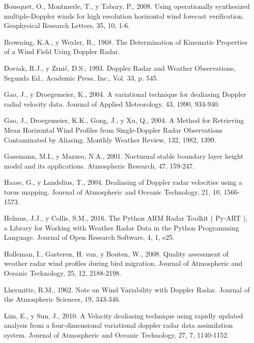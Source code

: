 \documentclass[12pt,spanish,oneside]{book}
\begin{document}
\hypertarget{ref-Bousquet2008}{}
Bousquet, O., Montmerle, T., y Tabary, P., 2008. Using operationally
synthesized multiple-Doppler winds for high resolution horizontal wind
forecast verification. Geophysical Research Letters, 35, 10, 1-6.

\hypertarget{ref-Browning1968}{}
Browning, K.A., y Wexler, R., 1968. The Determination of Kinematic
Properties of a Wind Field Using Doppler Radar.

\hypertarget{ref-Doviak1993}{}
Doviak, R.J., y Zrnić, D.S., 1993. Doppler Radar and Weather
Observations, Segunda Ed., Academic Press, Inc., Vol. 33, p. 545.

\hypertarget{ref-Gao2004}{}
Gao, J., y Droegemeier, K., 2004. A variational technique for dealiasing
Doppler radial velocity data. Journal of Applied Meteorology, 43, 1990,
934-940.

\hypertarget{ref-Gao2004a}{}
Gao, J., Droegemeier, K.K., Gong, J., y Xu, Q., 2004. A Method for
Retrieving Mean Horizontal Wind Profiles from Single-Doppler Radar
Observations Contaminated by Aliasing. Monthly Weather Review, 132,
1982, 1399.

\hypertarget{ref-Gassmann2001}{}
Gassmann, M.I., y Mazzeo, N.A., 2001. Nocturnal stable boundary layer
height model and its applications. Atmospheric Research, 47, 159-247.

\hypertarget{ref-Haase2004}{}
Haase, G., y Landelius, T., 2004. Dealiasing of Doppler radar velocities
using a torus mapping. Journal of Atmospheric and Oceanic Technology,
21, 10, 1566-1573.

\hypertarget{ref-Helmus2016}{}
Helmus, J.J., y Collis, S.M., 2016. The Python ARM Radar Toolkit (
Py-ART ), a Library for Working with Weather Radar Data in the Python
Programming Language. Journal of Open Research Software, 4, 1, e25.

\hypertarget{ref-Holleman2008}{}
Holleman, I., Gasteren, H. van, y Bouten, W., 2008. Quality assessment
of weather radar wind profiles during bird migration. Journal of
Atmospheric and Oceanic Technology, 25, 12, 2188-2198.

\hypertarget{ref-Lhermitte1962}{}
Lhermitte, R.M., 1962. Note on Wind Variability with Doppler Radar.
Journal of the Atmospheric Sciences, 19, 343-346.

\hypertarget{ref-Lim2010}{}
Lim, E., y Sun, J., 2010. A Velocity dealiasing technique using rapidly
updated analysis from a four-dimensional variational doppler radar data
assimilation system. Journal of Atmospheric and Oceanic Technology, 27,
7, 1140-1152.
\end{document}
